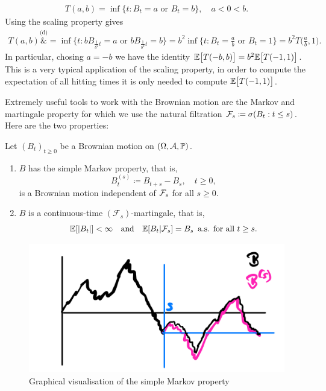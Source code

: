 \begin{align*}
	T(a,b)=\inf \{ t\colon B_t = a \text{ or }B_t = b\},\quad a<0<b.
\end{align*}	
Using the scaling property gives
\begin{align*}
	 T(a,b)  \overset{\text{(d)}}&{=} \inf \Big\{ t\colon b B_{\frac{1}{b^2}t} = a \text{ or } b B_{\frac{1}{b^2}t}=b \Big\} 
	= b^2   \inf\Big\{ t \colon B_t = \frac{a}{b} \text{ or } B_t = 1\Big\} 
	= b^2  T\Big(\frac{a}{b},1\Big).
\end{align*}
In particular, chosing $a=-b$ we have the identity $\E\big[ T(-b,b)\big] = b^2 \E \big[ T(-1,1)\big]$. This is a very typical application of the scaling property, in order to compute the expectation of all hitting times it is only needed to compute $\E\big[ T(-1,1)\big]$.\smallskip

Extremely useful tools to work with the Brownian motion are the Markov  and martingale property for which we use the natural filtration $\cF_s \coloneqq \sigma(B_t : t\leq s)$. Here are the two properties:
\begin{laussagewerkzeug}
\begin{prop}
	Let $(B_t)_{t\geq 0}$ be a Brownian motion on $(\Omega, \mathcal A, \P)$.
	\begin{enumerate}[label=(\roman*)]
		\item
			$B$ has the simple Markov property, that is,
			$$B_t^{(s)} \coloneqq B_{t+s} - B_s, \quad t\geq 0,$$ is a Brownian motion independent of $\cF_s$ for all $s\geq 0$.
		\item
			$B$ is a continuous-time $(\mathcal F_s)$-martingale, that is,
			$$\E[\lvert B_t \rvert ]<\infty\quad \text{and}\quad \E [B_t|\cF_s] = B_s\,\text{ a.s. for all }t\geq s.$$
	\end{enumerate}
\end{prop} 
\end{laussagewerkzeug}
\begin{figure}[h]
	\begin{center}
		\includegraphics[scale=0.1]{markov.jpeg}
		\caption*{Graphical visualisation of the simple Markov property}
	\end{center}
	\end{figure}

